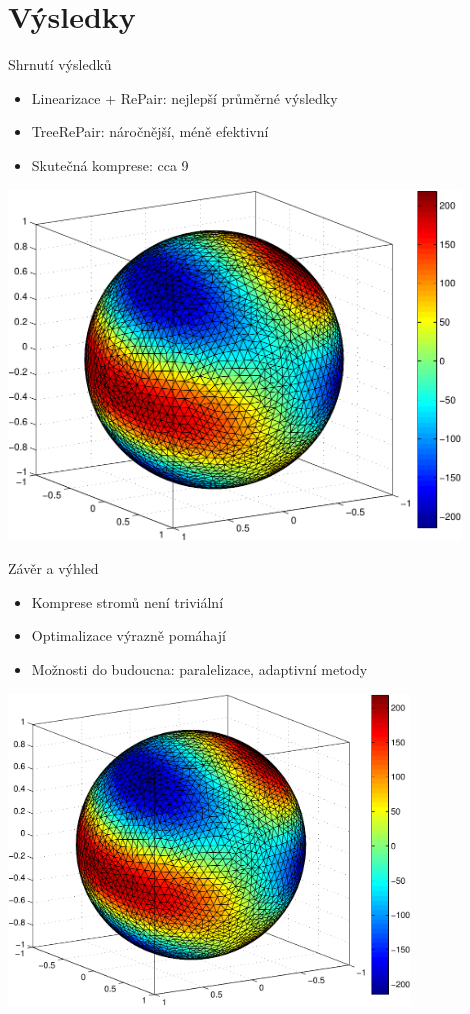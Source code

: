 \documentclass[lualatex,hyperref={pdfencoding=auto}]{beamer}
\begin{document}
\section{Výsledky}
\begin{frame}{Shrnutí výsledků}
\begin{itemize}
  \item Linearizace + RePair: nejlepší průměrné výsledky
  \item TreeRePair: náročnější, méně efektivní
  \item Skutečná komprese: cca 9 %
\end{itemize}
\includegraphics[width=0.9\textwidth]{fig/sphere_mix_real.pdf}
\end{frame}

\begin{frame}{Závěr a výhled}
\begin{itemize}
  \item Komprese stromů není triviální
  \item Optimalizace výrazně pomáhají
  \item Možnosti do budoucna: paralelizace, adaptivní metody
\end{itemize}
\includegraphics[width=0.8\textwidth]{fig/sphere_mix_real.pdf}
\end{frame}
\end{document}
